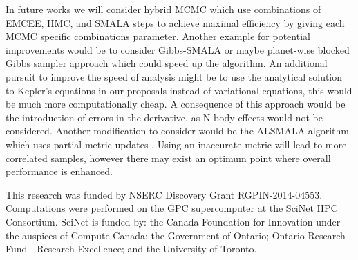 \documentclass{aa}
\begin{document}
In future works we will consider hybrid MCMC which use combinations of  EMCEE, HMC, and SMALA steps to achieve maximal efficiency by giving each MCMC specific combinations parameter. Another example for potential improvements would be to consider Gibbs-SMALA or maybe planet-wise blocked Gibbs sampler approach which could speed up the algorithm. An additional pursuit to improve the speed of analysis might be to use the analytical solution to Kepler's equations in our proposals instead of variational equations, this would be much more computationally cheap. A consequence of this approach would be the introduction of errors in the derivative, as N-body effects would not be considered. Another modification to consider would be the ALSMALA algorithm which uses partial metric updates \cite{1608.07986}. Using an inaccurate metric will lead to more correlated samples, however there may exist an optimum point where overall performance is enhanced.

\begin{acknowledgements}
	This research was funded by NSERC Discovery Grant RGPIN-2014-04553. Computations were performed on the GPC supercomputer at the SciNet HPC Consortium. SciNet is funded by: the Canada Foundation for Innovation under the auspices of Compute Canada; the Government of Ontario; Ontario Research Fund - Research Excellence; and the University of Toronto.
\end{acknowledgements}





\end{document}
